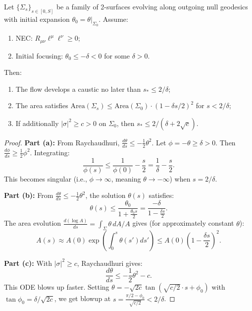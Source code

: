 \begin{theorem}
\label{thm:quantitative-focusing}
Let $\{\Sigma_s\}_{s \in [0, S]}$ be a family of 2-surfaces evolving along outgoing null geodesics with initial expansion $\theta_0 = \theta|_{\Sigma_0}$. Assume:
\begin{enumerate}[label=(\roman*)]
\item NEC: $R_{\mu\nu}\ell^\mu\ell^\nu \geq 0$;
\item Initial focusing: $\theta_0 \leq -\delta < 0$ for some $\delta > 0$.
\end{enumerate}
Then:
\begin{enumerate}[label=(\alph*)]
\item The flow develops a caustic no later than $s_* \leq 2/\delta$;
\item The area satisfies $\mathrm{Area}(\Sigma_s) \leq \mathrm{Area}(\Sigma_0) \cdot (1 - \delta s/2)^2$ for $s < 2/\delta$;
\item If additionally $|\sigma|^2 \geq c > 0$ on $\Sigma_0$, then $s_* \leq 2/(\delta + 2\sqrt{c})$.
\end{enumerate}
\end{theorem}

\begin{proof}
\textbf{Part (a):} From Raychaudhuri, $\frac{d\theta}{ds} \leq -\frac{1}{2}\theta^2$. Let $\phi = -\theta \geq \delta > 0$. Then $\frac{d\phi}{ds} \geq \frac{1}{2}\phi^2$. Integrating:
\begin{equation}
\frac{1}{\phi(s)} \leq \frac{1}{\phi(0)} - \frac{s}{2} = \frac{1}{\delta} - \frac{s}{2}.
\end{equation}
This becomes singular (i.e., $\phi \to \infty$, meaning $\theta \to -\infty$) when $s = 2/\delta$.

\textbf{Part (b):} From $\frac{d\theta}{ds} \leq -\frac{1}{2}\theta^2$, the solution $\theta(s)$ satisfies:
\begin{equation}
\theta(s) \leq \frac{\theta_0}{1 + \frac{\theta_0 s}{2}} = \frac{-\delta}{1 - \frac{\delta s}{2}}.
\end{equation}
The area evolution $\frac{d(\log A)}{ds} = \int_\Sigma \theta \, dA / A$ gives (for approximately constant $\theta$):
\begin{equation}
A(s) \approx A(0) \exp\left(\int_0^s \theta(s') ds'\right) \leq A(0) \left(1 - \frac{\delta s}{2}\right)^2.
\end{equation}

\textbf{Part (c):} With $|\sigma|^2 \geq c$, Raychaudhuri gives:
\begin{equation}
\frac{d\theta}{ds} \leq -\frac{1}{2}\theta^2 - c.
\end{equation}
This ODE blows up faster. Setting $\theta = -\sqrt{2c}\tan(\sqrt{c/2} \cdot s + \phi_0)$ with $\tan\phi_0 = \delta/\sqrt{2c}$, we get blowup at $s = \frac{\pi/2 - \phi_0}{\sqrt{c/2}} < 2/\delta$.
\end{proof}

